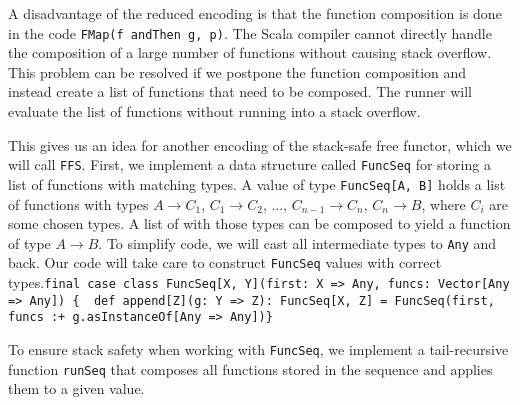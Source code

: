 A disadvantage of the reduced encoding is that the function composition
is done in the code \lstinline!FMap(f andThen g, p)!.
The Scala compiler cannot directly handle the composition of a large
number of functions without causing stack overflow. This problem can
be resolved if we postpone the function composition and instead create
a list of functions that need to be composed. The runner will evaluate
the list of functions without running into a stack overflow.

This gives us an idea for another encoding of the stack-safe free
functor, which we will call \lstinline!FFS!.
First, we implement a data structure called \lstinline!FuncSeq!
for storing a list of functions with matching types. A value of type
\lstinline!FuncSeq[A, B]!
holds a list of functions with types $A\rightarrow C_{1}$, $C_{1}\rightarrow C_{2}$,
..., $C_{n-1}\rightarrow C_{n}$, $C_{n}\rightarrow B$, where $C_{i}$
are some chosen types. A list of with those types can be composed
to yield a function of type $A\rightarrow B$. To simplify code, we
will cast all intermediate types to \lstinline!Any!
and back. Our code will take care to construct \lstinline!FuncSeq!
values with correct types.\lstinline!final case class FuncSeq[X, Y](first: X => Any, funcs: Vector[Any => Any]) {  def append[Z](g: Y => Z): FuncSeq[X, Z] = FuncSeq(first, funcs :+ g.asInstanceOf[Any => Any])}!

To ensure stack safety when working with \lstinline!FuncSeq!,
we implement a tail-recursive function \lstinline!runSeq!
that composes all functions stored in the sequence and applies them
to a given value.

